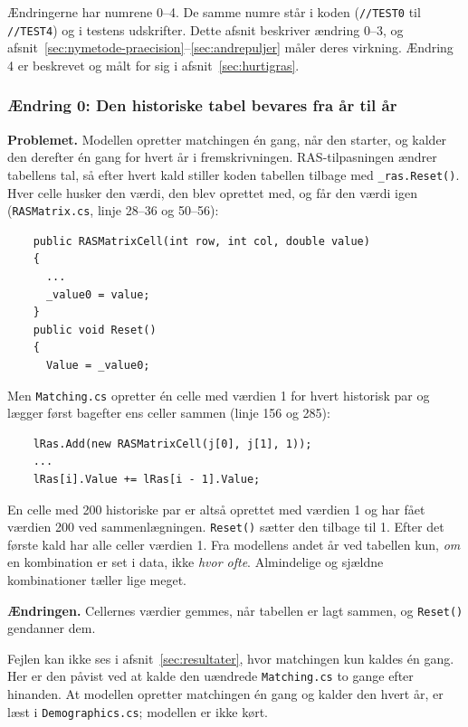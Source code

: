 \documentclass[11pt,a4paper]{article}
\newcommand{\kode}[1]{\texttt{#1}}
\begin{document}
Ændringerne har numrene 0--4. De samme numre står i koden (\kode{//TEST0} til \kode{//TEST4}) og i
testens udskrifter. Dette afsnit beskriver ændring 0--3, og
afsnit~\ref{sec:nymetode-praecision}--\ref{sec:andrepuljer} måler deres virkning. Ændring 4 er
beskrevet og målt for sig i afsnit~\ref{sec:hurtigras}.

\subsubsection*{Ændring 0: Den historiske tabel bevares fra år til år}

\textbf{Problemet.} Modellen opretter matchingen én gang, når den starter, og kalder den derefter én
gang for hvert år i fremskrivningen. RAS-tilpasningen ændrer tabellens tal, så efter hvert kald
stiller koden tabellen tilbage med \kode{\_ras.Reset()}. Hver celle husker den værdi, den blev
oprettet med, og får den værdi igen (\kode{RASMatrix.cs}, linje 28--36 og 50--56):

{\small
\begin{verbatim}
    public RASMatrixCell(int row, int col, double value)
    {
      ...
      _value0 = value;
    }
    public void Reset()
    {
      Value = _value0;
\end{verbatim}
}

Men \kode{Matching.cs} opretter én celle med værdien 1 for hvert historisk par og lægger først
bagefter ens celler sammen (linje 156 og 285):

{\small
\begin{verbatim}
    lRas.Add(new RASMatrixCell(j[0], j[1], 1));
    ...
    lRas[i].Value += lRas[i - 1].Value;
\end{verbatim}
}

En celle med 200 historiske par er altså oprettet med værdien 1 og har fået værdien 200 ved
sammenlægningen. \kode{Reset()} sætter den tilbage til 1. Efter det første kald har alle celler
værdien 1. Fra modellens andet år ved tabellen kun, \emph{om} en kombination er set i data, ikke
\emph{hvor ofte}. Almindelige og sjældne kombinationer tæller lige meget.

\textbf{Ændringen.} Cellernes værdier gemmes, når tabellen er lagt sammen, og \kode{Reset()}
gendanner dem.

Fejlen kan ikke ses i afsnit~\ref{sec:resultater}, hvor matchingen kun kaldes én gang. Her er den
påvist ved at kalde den uændrede \kode{Matching.cs} to gange efter hinanden. At modellen opretter
matchingen én gang og kalder den hvert år, er læst i \kode{Demographics.cs}; modellen er ikke kørt.
\end{document}
